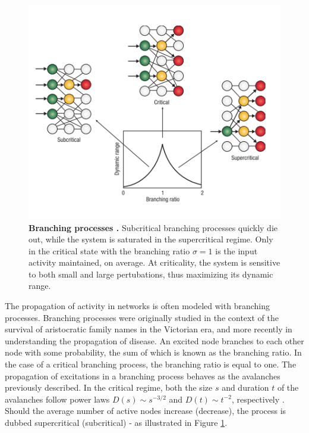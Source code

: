 \documentclass[12pt]{article}
\begin{document}
\begin{figure}[h] 
  \begin{center}    
 \includegraphics[width=.7\textwidth]{Branchingprocesschialvo}    
    \caption{\textbf{Branching processes \cite{Chialvo2006a}.} Subcritical branching processes quickly die out, while the system is saturated in the supercritical regime. Only in the critical state with the branching ratio $\sigma = 1$ is the input activity maintained, on average. At criticality, the system is sensitive to both small and large pertubations, thus maximizing its dynamic range.}
   \label{Figure::Critical Branching Process}   
  \end{center}     
   \end{figure}
The propagation of activity in networks is often modeled with branching processes. Branching processes were originally studied in the context of the survival of aristocratic family names in the Victorian era\cite{Watson2014}, and more recently in understanding the propagation of disease. An excited node branches to each other node with some probability, the sum of which is known as the branching ratio. In the case of a critical branching process, the branching ratio is equal to one. The propagation of excitations in a branching process behaves as the avalanches previously described. In the critical regime, both the size $s$ and duration $t$ of the avalanches follow power laws $ D(s) \sim s^{-3/2} $ and $ D(t) \sim t^{-2} $, respectively \cite{Larremore2014}. Should the average number of active nodes increase (decrease), the process is dubbed supercritical (subcritical) - as illustrated in Figure \ref{Figure::Critical Branching Process}. 
\end{document}
